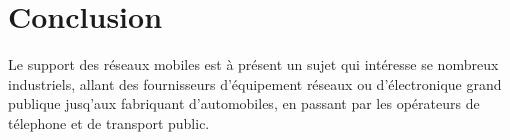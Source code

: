 \documentclass[12pt,a4paper]{report}
\begin{document}
\section{Conclusion}
Le support des r\'eseaux mobiles est \`a pr\'esent un sujet qui int\'eresse se nombreux industriels, allant des fournisseurs
 d'\'equipement r\'eseaux ou d'\'electronique grand publique jusq'aux fabriquant d'automobiles, en passant par les op\'erateurs de t\'elephone et de transport public. 

\end{document}
